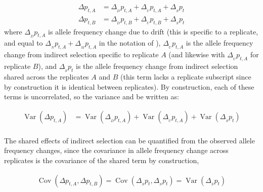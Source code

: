 \documentclass[11pt]{article}
\DeclareMathOperator{\var}{Var}
\DeclareMathOperator{\cov}{Cov}
\begin{document}
\begin{align}
  \Delta p_{t,A} &= \Delta_{_D} p_{t,A} + \Delta_{_{U}} p_{t,A} + \Delta_{_S} p_t \\
  \Delta p_{t,B} &= \Delta_{_D} p_{t,B} + \Delta_{_{U}} p_{t,B} + \Delta_{_S} p_t
\end{align}
%
where $\Delta_{_D} p_{t,A}$ is allele frequency change due to drift (this is
specific to a replicate, and equal to $\Delta_{_N} p_{t,A} + \Delta_{_M}
p_{t,A}$ in the notation of \cite{Buffalo2019-io}), $\Delta_{_{U}} p_{t,A}$ is
the allele frequency change from indirect selection specific to replicate $A$
(and likewise with $\Delta_{_{U}} p_{t,A}$ for replicate $B$), and $\Delta_{_S}
p_t$ is the allele frequency change from indirect selection shared across the
replicates $A$ and $B$ (this term lacks a replicate subscript since by
construction it is identical between replicates). By construction, each of
these terms is uncorrelated, so the variance and be written as:

\begin{align}
  \var(\Delta p_{t,A}) &= \var(\Delta_{_D} p_{t,A}) + \var(\Delta_{_{U}} p_{t,A}) + \var(\Delta_{_S} p_t) \\
\end{align}

The shared effects of indirect selection can be quantified from the observed
allele frequency changes, since the covariance in allele frequency change
across replicates is the covariance of the shared term by construction, 

\begin{align}
  \cov(\Delta p_{t,A}, \Delta p_{t,B}) = \cov(\Delta_{_S} p_{t}, \Delta_{_S} p_{t}) = \var(\Delta_{_S} p_{t})
\end{align}
\end{document}
